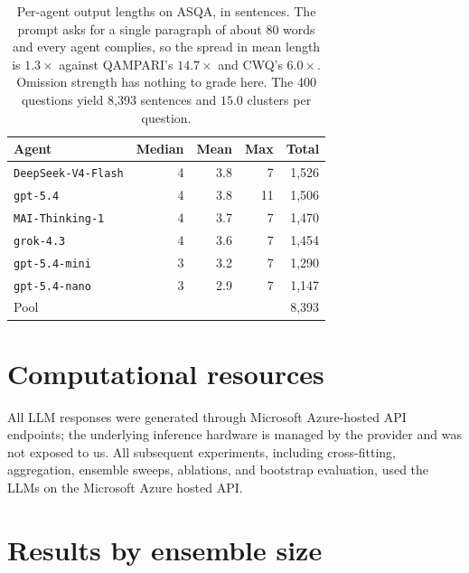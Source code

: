 \documentclass[11pt]{article}
\begin{document}
\begin{table}[t]
  \caption{Per-agent output lengths on ASQA, in sentences. The prompt asks for a single paragraph of about 80 words and every agent complies, so the spread in mean length is $1.3\times$ against QAMPARI's $14.7\times$ and CWQ's $6.0\times$. Omission strength has nothing to grade here. The 400 questions yield 8,393 sentences and $15.0$ clusters per question.}
  \label{tab:asqa-lengths}
  \centering
  \begin{tabular}{lrrrr}
    \toprule
    Agent & Median & Mean & Max & Total \\
    \midrule
    \texttt{DeepSeek-V4-Flash} & 4 & 3.8 &  7 & 1,526 \\
    \texttt{gpt-5.4}           & 4 & 3.8 & 11 & 1,506 \\
    \texttt{MAI-Thinking-1}    & 4 & 3.7 &  7 & 1,470 \\
    \texttt{grok-4.3}          & 4 & 3.6 &  7 & 1,454 \\
    \texttt{gpt-5.4-mini}      & 3 & 3.2 &  7 & 1,290 \\
    \texttt{gpt-5.4-nano}      & 3 & 2.9 &  7 & 1,147 \\
    \midrule
    Pool                       &   &     &    & 8,393 \\
    \bottomrule
  \end{tabular}
\end{table}

\section{Computational resources}
All LLM responses were generated through Microsoft Azure-hosted API
endpoints; the underlying inference hardware is managed by the provider
and was not exposed to us. All subsequent experiments, including
cross-fitting, aggregation, ensemble sweeps, ablations, and bootstrap
evaluation, used the LLMs on the Microsoft Azure hosted API.

\section{Results by ensemble size}
\label{app:ensembles}
\end{document}
